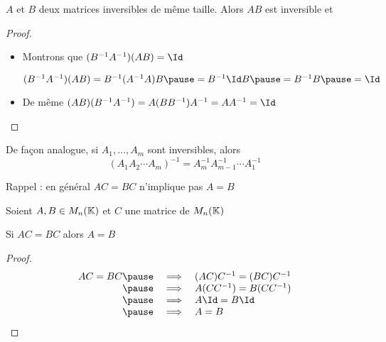 \begin{frame}

\begin{proposition}%
 $A$ et $B$ deux matrices inversibles de même taille. Alors
 $AB$ est inversible 
 \pause
 et  \vspace*{-2ex}
\end{proposition}

\medskip
\pause
{}
\medskip

\pause
\begin{proof}
\begin{itemize}
\item Montrons que $(B^{-1}A^{-1}) (AB) = \Id$

\pause
\centerline{$
   (B^{-1}A^{-1}) (AB) = B^{-1}(A^{-1}A)B \pause= B^{-1}\Id B\pause=B^{-1}B\pause=\Id
$}
\item\pause De même $(AB) (B^{-1} A^{-1})=A(BB^{-1})A^{-1} = A A^{-1} =  \Id$ \qedhere
 \end{itemize}
\end{proof}
 
\pause
De façon analogue, si $A_1, \dots , A_m$ sont inversibles, alors
\[
(A_1 A_2 \cdots A_m)^{-1} = A_m^{-1} A_{m-1}^{-1} \cdots A^{-1}_1
\]
\end{frame}



\begin{frame}

Rappel : en général  $AC=BC$ n'implique pas $A=B$
\medskip

\pause
\begin{proposition}%
Soient $A, B\in M_{n}(\mathbb{K})$ et $C$ une matrice  de $M_{n}(\mathbb{K})$

\smallskip
\pause
\centerline{Si $AC=BC$ alors $A=B$}
\end{proposition}

\pause
\begin{proof} 
$$\begin{array}{rcl}
AC=BC 
\pause&\implies& (AC)C^{-1}=(BC)C^{-1}\\
\pause&\implies& A(CC^{-1})=B(CC^{-1})\\
\pause&\implies& A\Id=B\Id\\
\pause&\implies& A=B
\end{array}$$
\end{proof} 

\end{frame}

